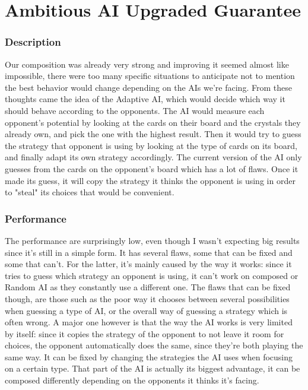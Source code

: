 
\part{Ambitious AI Upgraded Guarantee}
        \section{Description}
        Our composition was already very strong and improving it seemed almost like impossible, there were too many specific situations to anticipate not to mention the best behavior would change depending on the AIs we're facing. From these thoughts came the idea of the Adaptive AI, which would decide which way it should behave according to the opponents. The AI would measure each opponent's potential by looking at the cards on their board and the crystals they already own, and pick the one with the highest result. Then it would try to guess the strategy that opponent is using by looking at the type of cards on its board, and finally adapt its own strategy accordingly. The current version of the AI only guesses from the cards on the opponent's board which has a lot of flaws. Once it made its guess, it will copy the strategy it thinks the opponent is using in order to "steal" its choices that would be convenient.
        
        
        \section{Performance}
        The performance are surprisingly low, even though I wasn't expecting big results since it's still in a simple form. It has several flaws, some that can be fixed and some that can't.
        For the latter, it's mainly caused by the way it works: since it tries to guess which strategy an opponent is using, it can't work on composed or Random AI as they constantly use a different one.
        The flaws that can be fixed though, are those such as the poor way it chooses between several possibilities when guessing a type of AI, or the overall way of guessing a strategy which is often wrong. A major one however is that the way the AI works is very limited by itself: since it copies the strategy of the opponent to not leave it room for choices, the opponent automatically does the same, since they're both playing the same way. It can be fixed by changing the strategies the AI uses when focusing on a certain type. That part of the AI is actually its biggest advantage, it can be composed differently depending on the opponents it thinks it's facing.
        
